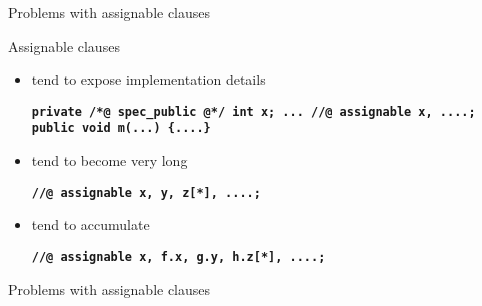 \documentclass[
pdf,
nocolorBG,
slideColor,
erik,
]{prosper}
\newcommand{\code}[1]{{\rm \texttt{\textbf{\small #1}}}}
\begin{document}
\begin{slide}{Problems with assignable clauses}
\vspace*{-4ex}

Assignable clauses
\begin{itemize}
\item tend to expose implementation details
\begin{alltt}\code{\scriptsize  private /*@ spec_public @*/ int x;
  ...
  //@ assignable x, ....;
  public void m(...) \{....\} }
\end{alltt}
\item tend to become very long
\begin{alltt}\code{\scriptsize  //@ assignable x, y, z[*],  ....;}
\end{alltt}
\item tend to accumulate
\begin{alltt}\code{\scriptsize  //@ assignable x, f.x, g.y, h.z[*], ....;}
\end{alltt}
\end{itemize}
\end{slide}

\begin{slide}{Problems with assignable clauses}
\vspace*{-4ex}




\end{slide}
\end{document}
